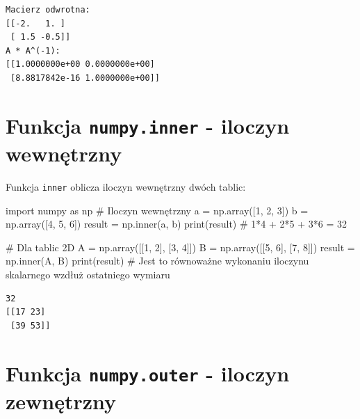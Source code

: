 \documentclass[
  polish,
  letterpaper,
  DIV=11,
  numbers=noendperiod]{scrreprt}
\newenvironment{Shaded}{\begin{snugshade}}{\end{snugshade}}
\newcommand{\BuiltInTok}[1]{\textcolor[rgb]{0.00,0.23,0.31}{#1}}
\newcommand{\CommentTok}[1]{\textcolor[rgb]{0.37,0.37,0.37}{#1}}
\newcommand{\DecValTok}[1]{\textcolor[rgb]{0.68,0.00,0.00}{#1}}
\newcommand{\ImportTok}[1]{\textcolor[rgb]{0.00,0.46,0.62}{#1}}
\newcommand{\NormalTok}[1]{\textcolor[rgb]{0.00,0.23,0.31}{#1}}
\newcommand{\OperatorTok}[1]{\textcolor[rgb]{0.37,0.37,0.37}{#1}}
\begin{document}
\begin{verbatim}
Macierz odwrotna:
[[-2.   1. ]
 [ 1.5 -0.5]]
A * A^(-1):
[[1.0000000e+00 0.0000000e+00]
 [8.8817842e-16 1.0000000e+00]]
\end{verbatim}

\section{\texorpdfstring{Funkcja \texttt{numpy.inner} - iloczyn
wewnętrzny}{Funkcja numpy.inner - iloczyn wewnętrzny}}\label{funkcja-numpy.inner---iloczyn-wewnux119trzny}

Funkcja \texttt{inner} oblicza iloczyn wewnętrzny dwóch tablic:

\begin{Shaded}
\begin{Highlighting}[]
\ImportTok{import}\NormalTok{ numpy }\ImportTok{as}\NormalTok{ np}
\CommentTok{\# Iloczyn wewnętrzny}
\NormalTok{a }\OperatorTok{=}\NormalTok{ np.array([}\DecValTok{1}\NormalTok{, }\DecValTok{2}\NormalTok{, }\DecValTok{3}\NormalTok{])}
\NormalTok{b }\OperatorTok{=}\NormalTok{ np.array([}\DecValTok{4}\NormalTok{, }\DecValTok{5}\NormalTok{, }\DecValTok{6}\NormalTok{])}
\NormalTok{result }\OperatorTok{=}\NormalTok{ np.inner(a, b)}
\BuiltInTok{print}\NormalTok{(result)  }\CommentTok{\# 1*4 + 2*5 + 3*6 = 32}

\CommentTok{\# Dla tablic 2D}
\NormalTok{A }\OperatorTok{=}\NormalTok{ np.array([[}\DecValTok{1}\NormalTok{, }\DecValTok{2}\NormalTok{], [}\DecValTok{3}\NormalTok{, }\DecValTok{4}\NormalTok{]])}
\NormalTok{B }\OperatorTok{=}\NormalTok{ np.array([[}\DecValTok{5}\NormalTok{, }\DecValTok{6}\NormalTok{], [}\DecValTok{7}\NormalTok{, }\DecValTok{8}\NormalTok{]])}
\NormalTok{result }\OperatorTok{=}\NormalTok{ np.inner(A, B)}
\BuiltInTok{print}\NormalTok{(result)}
\CommentTok{\# Jest to równoważne wykonaniu iloczynu skalarnego wzdłuż ostatniego wymiaru}
\end{Highlighting}
\end{Shaded}

\begin{verbatim}
32
[[17 23]
 [39 53]]
\end{verbatim}

\section{\texorpdfstring{Funkcja \texttt{numpy.outer} - iloczyn
zewnętrzny}{Funkcja numpy.outer - iloczyn zewnętrzny}}\label{funkcja-numpy.outer---iloczyn-zewnux119trzny}
\end{document}
